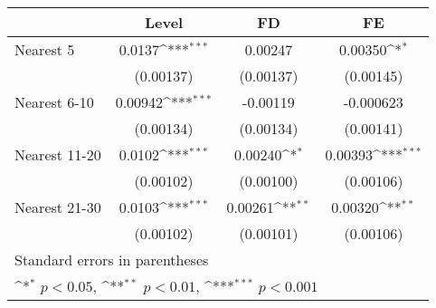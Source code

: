 {
\def\sym#1{\ifmmode^{#1}\else\(^{#1}\)\fi}
\begin{tabular}{l*{3}{c}}
\hline\hline
            &\multicolumn{1}{c}{Level}&\multicolumn{1}{c}{FD}&\multicolumn{1}{c}{FE}\\
\hline
Nearest 5   &      0.0137\sym{***}&     0.00247         &     0.00350\sym{*}  \\
            &   (0.00137)         &   (0.00137)         &   (0.00145)         \\
[1em]
Nearest 6-10&     0.00942\sym{***}&    -0.00119         &   -0.000623         \\
            &   (0.00134)         &   (0.00134)         &   (0.00141)         \\
[1em]
Nearest 11-20&      0.0102\sym{***}&     0.00240\sym{*}  &     0.00393\sym{***}\\
            &   (0.00102)         &   (0.00100)         &   (0.00106)         \\
[1em]
Nearest 21-30&      0.0103\sym{***}&     0.00261\sym{**} &     0.00320\sym{**} \\
            &   (0.00102)         &   (0.00101)         &   (0.00106)         \\
\hline\hline
\multicolumn{4}{l}{\footnotesize Standard errors in parentheses}\\
\multicolumn{4}{l}{\footnotesize \sym{*} \(p<0.05\), \sym{**} \(p<0.01\), \sym{***} \(p<0.001\)}\\
\end{tabular}
}
